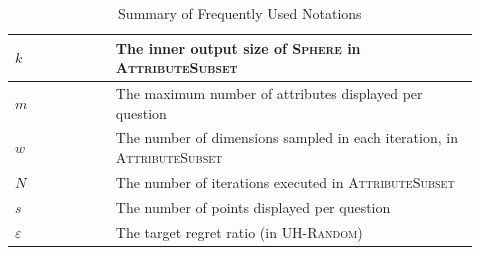 \begin{table}[h]
\begin{tabular}{|>{\centering\arraybackslash}m{0.20\linewidth}|>{\centering\arraybackslash}m{0.72\linewidth}|}
\hline
$k$ & The inner output size of \textsc{Sphere} in \textsc{AttributeSubset} \\
\hline
$m$ & The maximum number of attributes displayed per question \\
\hline
$w$ & The number of dimensions sampled in each iteration, in \textsc{AttributeSubset} \\
\hline
$N$ & The number of iterations executed in \textsc{AttributeSubset} \\
\hline
$s$ & The number of points displayed per question \\
\hline
$\varepsilon$ & The target regret ratio (in \textsc{UH-Random})\\
\hline
\end{tabular}
\caption{Summary of Frequently Used Notations}
\label{tab:notations}
\end{table}

\iftoggle{TechnicalReport}
  {\section{Remaining Proofs and Cap Analysis}}
  {\section{Remaining Proofs}}
\label{appen:proof}

